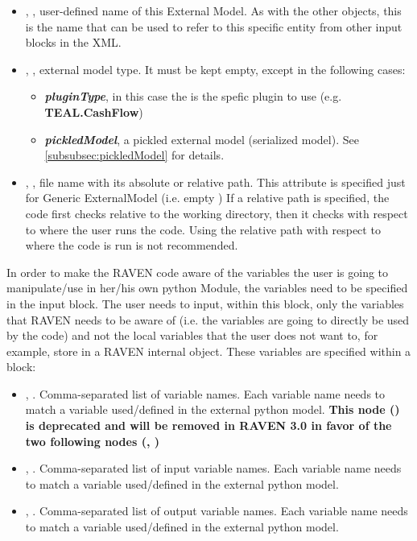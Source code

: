 \vspace{-5mm}
\begin{itemize}
  \itemsep0em
  \item {}, , user-defined name
  of this External Model.
  \nb As with the other objects, this is the name that can be used to refer to
  this specific entity from other input blocks in the XML.
  \item {}, , external model type. It must be kept empty, except in the following cases:
  \begin{itemize}
    \item  \textbf{\textit{pluginType}}, in this case the   is the spefic plugin to use (e.g. \textbf{TEAL.CashFlow})
    \item  \textbf{\textit{pickledModel}}, a pickled external model (serialized model). See \ref{subsubsec:pickledModel}   for details.
  \end{itemize}    
  
  \item {}, , file name
  with its absolute or relative path. This attribute is specified just for Generic ExternalModel (i.e.  empty )
  \nb If a relative path is specified, the code first checks relative
  to the working directory, then it checks with respect to where the
  user runs the code.  Using the relative path with respect to where the
  code is run is not recommended.
\end{itemize}
\vspace{-5mm}

In order to make the RAVEN code aware of the variables the user is going to
manipulate/use in her/his own python Module, the variables need to be specified
in the  input block.
%
The user needs to input, within this block, only the variables that RAVEN needs
to be aware of (i.e. the variables are going to directly be used by the code)
and not the local variables that the user does not want to, for example, store
in a RAVEN internal object.
%
These variables are specified within a  block:
\begin{itemize}
  \item {}, .
  Comma-separated list of variable names.
  Each variable name needs to match a variable used/defined in the external python
  model.
  \nb \textbf{This node () is deprecated and will be removed in RAVEN 3.0 in favor of the two following nodes (, ) }
   \item {}, .
  Comma-separated list of input variable names.
  Each variable name needs to match a variable used/defined in the external python
  model.
   \item {}, .
  Comma-separated list of output variable names.
  Each variable name needs to match a variable used/defined in the external python
  model.
\end{itemize}

